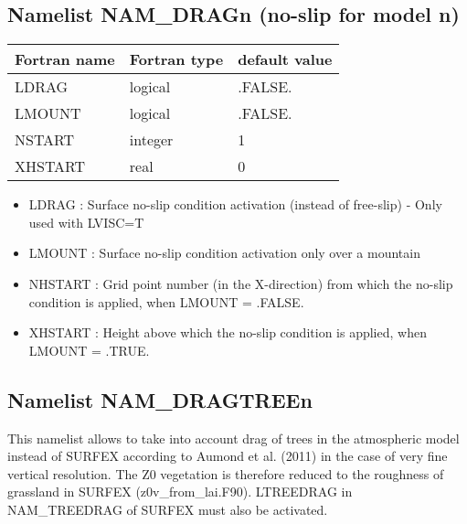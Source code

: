 \subsection{Namelist NAM\_DRAGn (no-slip for model n)}
\begin{center}
\begin{tabular}{|l|l|l| }
\hline 
 Fortran name  & Fortran type  & default value \\
\hline
 LDRAG & logical       & .FALSE.           \\
 LMOUNT & logical       & .FALSE.           \\
 NSTART & integer       & 1           \\
 XHSTART & real       & 0           \\
 \hline
\end{tabular}
\end{center}

\begin{itemize}
\item   {}
LDRAG : Surface no-slip condition activation (instead of free-slip) - Only used with LVISC=T

\item   {}
LMOUNT : Surface no-slip condition activation only over a mountain

\item   {}
NHSTART : Grid point number (in the X-direction) from which the no-slip condition is applied, when LMOUNT = .FALSE.

\item   {}
XHSTART : Height above  which the no-slip condition is applied, when LMOUNT = .TRUE. 

\end{itemize}

\subsection{Namelist NAM\_DRAGTREEn}
This namelist allows to take into account drag of trees in the atmospheric model instead of SURFEX according
to Aumond et al. (2011) in the case of very fine vertical resolution. 
The Z0 vegetation is therefore reduced to the roughness of grassland in SURFEX
 (z0v\_from\_lai.F90). LTREEDRAG in NAM\_TREEDRAG of SURFEX must also be activated.

